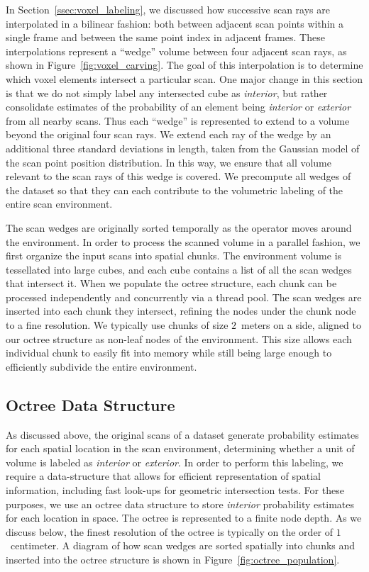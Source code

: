 \documentclass[12pt,onecolumn,oneside]{book}
\begin{document}
In Section~\ref{ssec:voxel_labeling}, we discussed how successive scan rays are interpolated in a bilinear fashion:  both between adjacent scan points within a single frame and between the same point index in adjacent frames.  These interpolations represent a ``wedge'' volume between four adjacent scan rays, as shown in Figure~\ref{fig:voxel_carving}.  The goal of this interpolation is to determine which voxel elements intersect a particular scan.  One major change in this section is that we do not simply label any intersected cube as {\it interior}, but rather consolidate estimates of the probability of an element being {\it interior} or {\it exterior} from all nearby scans.  Thus each ``wedge'' is represented to extend to a volume beyond the original four scan rays.  We extend each ray of the wedge by an additional three standard deviations in length, taken from the Gaussian model of the scan point position distribution.  In this way, we ensure that all volume relevant to the scan rays of this wedge is covered.  We precompute all wedges of the dataset so that they can each contribute to the volumetric labeling of the entire scan environment.

The scan wedges are originally sorted temporally as the operator moves around the environment.  In order to process the scanned volume in a parallel fashion, we first organize the input scans into spatial chunks.  The environment volume is tessellated into large cubes, and each cube contains a list of all the scan wedges that intersect it.  When we populate the octree structure, each chunk can be processed independently and concurrently via a thread pool.  The scan wedges are inserted into each chunk they intersect, refining the nodes under the chunk node to a fine resolution.  We typically use chunks of size $2$~meters on a side, aligned to our octree structure as non-leaf nodes of the environment.  This size allows each individual chunk to easily fit into memory while still being large enough to efficiently subdivide the entire environment.

\subsection{Octree Data Structure}
\label{ssec:procarve_octree}

As discussed above, the original scans of a dataset generate probability estimates for each spatial location in the scan environment, determining whether a unit of volume is labeled as {\it interior} or {\it exterior}.  In order to perform this labeling, we require a data-structure that allows for efficient representation of spatial information, including fast look-ups for geometric intersection tests.  For these purposes, we use an octree data structure to store {\it interior} probability estimates for each location in space.  The octree is represented to a finite node depth.  As we discuss below, the finest resolution of the octree is typically on the order of $1$~centimeter.  A diagram of how scan wedges are sorted spatially into chunks and inserted into the octree structure is shown in Figure~\ref{fig:octree_population}.
\end{document}
